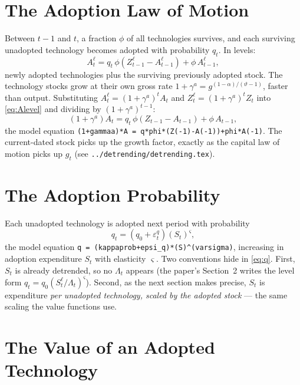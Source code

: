 \documentclass[11pt]{article}
\begin{document}
\section{The Adoption Law of Motion}

Between $t-1$ and $t$, a fraction $\phi$ of all technologies survives, and each
surviving unadopted technology becomes adopted with probability $q_t$. In levels:
\begin{equation}\label{eq:Alevel}
    A^{\ell}_t = q_t\,\phi\left(Z^{\ell}_{t-1} - A^{\ell}_{t-1}\right)
    + \phi\,A^{\ell}_{t-1},
\end{equation}
newly adopted technologies plus the surviving previously adopted stock. The
technology stocks grow at their own gross rate
$1+\gamma^{a} = g^{(1-\alpha)/(\vartheta-1)}$, faster than output. Substituting
$A^{\ell}_t = (1+\gamma^{a})^{t} A_t$ and $Z^{\ell}_t = (1+\gamma^{a})^{t} Z_t$
into \eqref{eq:Alevel} and dividing by $(1+\gamma^{a})^{t-1}$:
\begin{equation}\label{eq:Astat}
    \left(1+\gamma^{a}\right) A_t
    = q_t\,\phi\left(Z_{t-1} - A_{t-1}\right) + \phi\,A_{t-1},
\end{equation}
the model equation \texttt{(1+gammaa)*A = q*phi*(Z(-1)-A(-1))+phi*A(-1)}. The
current-dated stock picks up the growth factor, exactly as the capital law of
motion picks up $g_t$ (see \texttt{../detrending/detrending.tex}).

\section{The Adoption Probability}

Each unadopted technology is adopted next period with probability
\begin{equation}\label{eq:q}
    q_t = \left(q_0 + \varepsilon^{q}_t\right)\left(S_t\right)^{\varsigma},
\end{equation}
the model equation \texttt{q = (kappaprob+epsi\_q)*(S)\^{}(varsigma)}, increasing
in adoption expenditure $S_t$ with elasticity $\varsigma$. Two conventions hide in
\eqref{eq:q}. First, $S_t$ is already detrended, so no $\Lambda_t$ appears (the
paper's Section~2 writes the level form $q_t = q_0(S^{\ell}_t/\Lambda_t)^{\varsigma}$).
Second, as the next section makes precise, $S_t$ is expenditure \emph{per
unadopted technology, scaled by the adopted stock} --- the same scaling the value
functions use.

\section{The Value of an Adopted Technology}
\end{document}
